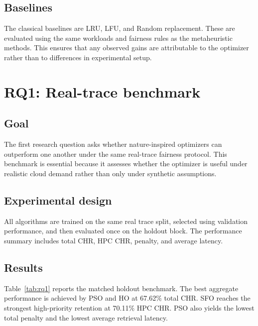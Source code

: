 \documentclass[10pt,journal,compsoc]{IEEEtran}
\begin{document}
\subsection{Baselines}
The classical baselines are LRU, LFU, and Random replacement. These are evaluated using the same workloads and fairness rules as the metaheuristic methods. This ensures that any observed gains are attributable to the optimizer rather than to differences in experimental setup.

\section{RQ1: Real-trace benchmark}
\subsection{Goal}
The first research question asks whether nature-inspired optimizers can outperform one another under the same real-trace fairness protocol. This benchmark is essential because it assesses whether the optimizer is useful under realistic cloud demand rather than only under synthetic assumptions.

\subsection{Experimental design}
All algorithms are trained on the same real trace split, selected using validation performance, and then evaluated once on the holdout block. The performance summary includes total CHR, HPC CHR, penalty, and average latency.

\subsection{Results}
Table~\ref{tab:rq1} reports the matched holdout benchmark. The best aggregate performance is achieved by PSO and HO at 67.62\% total CHR. SFO reaches the strongest high-priority retention at 70.11\% HPC CHR. PSO also yields the lowest total penalty and the lowest average retrieval latency.
\end{document}
